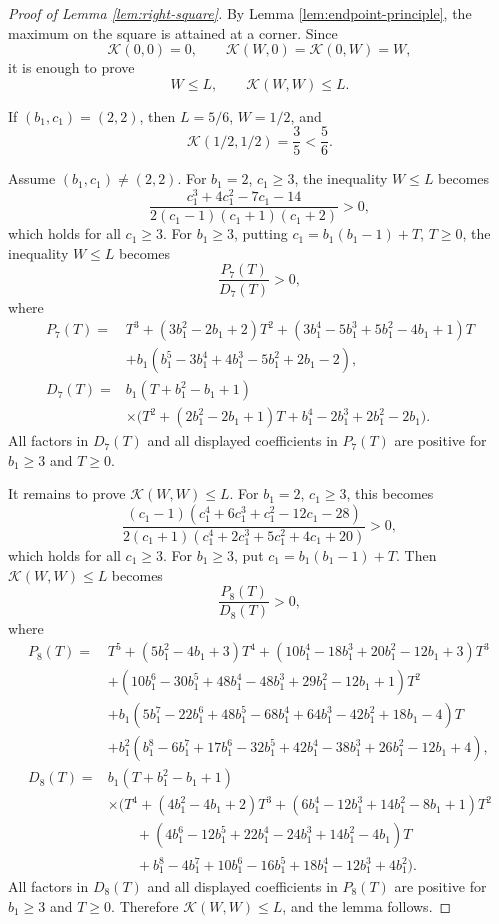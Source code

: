 \documentclass[11pt]{amsart}
\newcommand{\Kfun}{\mathcal K}
\begin{document}
\begin{proof}[Proof of Lemma \ref{lem:right-square}]
By Lemma \ref{lem:endpoint-principle}, the maximum on the square is attained at
a corner.  Since
$$
        \Kfun(0,0)=0,
        \qquad
        \Kfun(W,0)=\Kfun(0,W)=W,
$$
it is enough to prove
$$
        W\le L,
        \qquad
        \Kfun(W,W)\le L.
$$

If $(b_1,c_1)=(2,2)$, then $L=5/6$, $W=1/2$, and
$$
        \Kfun(1/2,1/2)=\frac35<\frac56.
$$

Assume $(b_1,c_1)\ne(2,2)$.  For $b_1=2$, $c_1\geq3$, the inequality $W\le L$ becomes
$$
        \frac{c_1^3+4c_1^2-7c_1-14}{2(c_1-1)(c_1+1)(c_1+2)}>0,
$$
which holds for all $c_1\ge3$.
For $b_1\ge3$, putting $c_1=b_1(b_1-1)+T$, $T\ge0$, the inequality $W\le L$ becomes
$$
        \frac{P_7(T)}{D_7(T)}>0,
$$
where
\begin{align*}
P_7(T)={}&T^3+(3b_1^2-2b_1+2)T^2
        +(3b_1^4-5b_1^3+5b_1^2-4b_1+1)T\\
        &+b_1(b_1^5-3b_1^4+4b_1^3-5b_1^2+2b_1-2),\\[3pt]
D_7(T)={}&b_1(T+b_1^2-b_1+1)\\
        &\times\bigl(T^2+(2b_1^2-2b_1+1)T+b_1^4-2b_1^3+2b_1^2-2b_1\bigr).
\end{align*}
All factors in $D_7(T)$ and all displayed coefficients in $P_7(T)$ are positive for $b_1\ge3$ and $T\ge0$.

It remains to prove $\Kfun(W,W)\le L$.  For $b_1=2$, $c_1\geq3$, this becomes
$$
        \frac{(c_1-1)(c_1^4+6c_1^3+c_1^2-12c_1-28)}{2(c_1+1)(c_1^4+2c_1^3+5c_1^2+4c_1+20)}>0,
$$
which holds for all $c_1\ge3$.
For $b_1\ge3$, put $c_1=b_1(b_1-1)+T$.  Then $\Kfun(W,W)\le L$ becomes
$$
        \frac{P_8(T)}{D_8(T)}>0,
$$
where
\begin{align*}
P_8(T)={}&T^5+(5b_1^2-4b_1+3)T^4
        +(10b_1^4-18b_1^3+20b_1^2-12b_1+3)T^3\\
        &+(10b_1^6-30b_1^5+48b_1^4-48b_1^3+29b_1^2-12b_1+1)T^2\\
        &+b_1(5b_1^7-22b_1^6+48b_1^5-68b_1^4+64b_1^3-42b_1^2+18b_1-4)T\\
        &+b_1^2(b_1^8-6b_1^7+17b_1^6-32b_1^5+42b_1^4-38b_1^3+26b_1^2-12b_1+4),\\[3pt]
D_8(T)={}&b_1(T+b_1^2-b_1+1)\\
        &\times\bigl(T^4+(4b_1^2-4b_1+2)T^3+(6b_1^4-12b_1^3+14b_1^2-8b_1+1)T^2\\
        &\qquad +(4b_1^6-12b_1^5+22b_1^4-24b_1^3+14b_1^2-4b_1)T\\
        &\qquad +b_1^8-4b_1^7+10b_1^6-16b_1^5+18b_1^4-12b_1^3+4b_1^2\bigr).
\end{align*}
All factors in $D_8(T)$ and all displayed coefficients in $P_8(T)$ are positive for $b_1\ge3$ and $T\ge0$.  Therefore
$\Kfun(W,W)\le L$, and the lemma follows.

\end{proof}







    
\end{document}
